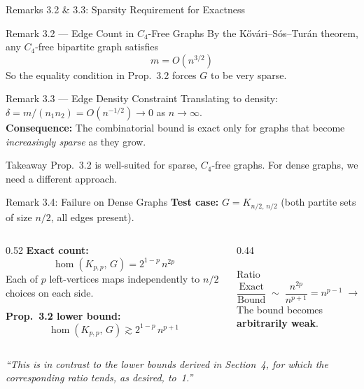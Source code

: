 \documentclass[10pt]{beamer}
\begin{document}
\begin{frame}{Remarks 3.2 \& 3.3: Sparsity Requirement for Exactness}
  \begin{block}{Remark 3.2 --- Edge Count in $C_4$-Free Graphs}
    By the K\H{o}v\'ari--S\'os--Tur\'an theorem, any $C_4$-free bipartite graph satisfies
    \[
      m = O(n^{3/2})
    \]
    So the equality condition in Prop.\ 3.2 forces $G$ to be very sparse.
  \end{block}

  \begin{block}{Remark 3.3 --- Edge Density Constraint}
    Translating to density: $\delta = m/(n_1 n_2) = O(n^{-1/2}) \to 0$ as $n \to \infty$.\\[0.3em]
    \textbf{Consequence:} The combinatorial bound is exact only for graphs that become \emph{increasingly sparse} as they grow.
  \end{block}

  \begin{alertblock}{Takeaway}
    Prop.\ 3.2 is well-suited for sparse, $C_4$-free graphs. For dense graphs, we need a different approach.
  \end{alertblock}
\end{frame}

\begin{frame}{Remark 3.4: Failure on Dense Graphs}
  \textbf{Test case:} $G = K_{n/2,\,n/2}$ (both partite sets of size $n/2$, all edges present).

  \begin{columns}
    \begin{column}{0.52\textwidth}
      \textbf{Exact count:}
      \[
        \hom(K_{p,p},\,G) = 2^{1-p}\,n^{2p}
      \]
      Each of $p$ left-vertices maps independently to $n/2$ choices on each side.

      \textbf{Prop.\ 3.2 lower bound:}
      \[
        \hom(K_{p,p},\,G) \gtrsim 2^{1-p}\,n^{p+1}
      \]
    \end{column}
    \begin{column}{0.44\textwidth}
      \begin{alertblock}{Ratio}
        \[
          \frac{\text{Exact}}{\text{Bound}} \;\sim\; \frac{n^{2p}}{n^{p+1}} = n^{p-1} \;\to\; \infty
        \]
        The bound becomes \textbf{arbitrarily weak}.
      \end{alertblock}
    \end{column}
  \end{columns}

  \vspace{0.5em}
  \textit{``This is in contrast to the lower bounds derived in Section~4, for which the corresponding ratio tends, as desired, to~1.''}
\end{frame}
\end{document}
